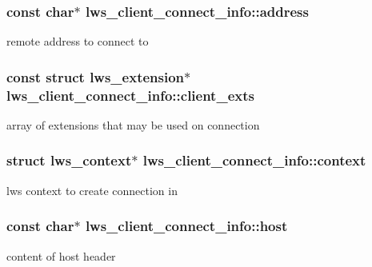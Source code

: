 \subsubsection[{\texorpdfstring{address}{address}}]{\setlength{\rightskip}{0pt plus 5cm}const char$\ast$ lws\+\_\+client\+\_\+connect\+\_\+info\+::address}\hypertarget{structlws__client__connect__info_aa364094f94ef1bcaaabbd9161971d502}{}\label{structlws__client__connect__info_aa364094f94ef1bcaaabbd9161971d502}
remote address to connect to 
\subsubsection[{\texorpdfstring{client\+\_\+exts}{client\_exts}}]{\setlength{\rightskip}{0pt plus 5cm}const struct {\bf lws\+\_\+extension}$\ast$ lws\+\_\+client\+\_\+connect\+\_\+info\+::client\+\_\+exts}\hypertarget{structlws__client__connect__info_a7732b996e977393c3e1076be2a8ded6c}{}\label{structlws__client__connect__info_a7732b996e977393c3e1076be2a8ded6c}
array of extensions that may be used on connection 
\subsubsection[{\texorpdfstring{context}{context}}]{\setlength{\rightskip}{0pt plus 5cm}struct lws\+\_\+context$\ast$ lws\+\_\+client\+\_\+connect\+\_\+info\+::context}\hypertarget{structlws__client__connect__info_afe999d133cc240a0bfd02aade0514cfd}{}\label{structlws__client__connect__info_afe999d133cc240a0bfd02aade0514cfd}
lws context to create connection in 
\subsubsection[{\texorpdfstring{host}{host}}]{\setlength{\rightskip}{0pt plus 5cm}const char$\ast$ lws\+\_\+client\+\_\+connect\+\_\+info\+::host}\hypertarget{structlws__client__connect__info_a9b36d47c3422329df32c21040a35ebc7}{}\label{structlws__client__connect__info_a9b36d47c3422329df32c21040a35ebc7}
content of host header 
